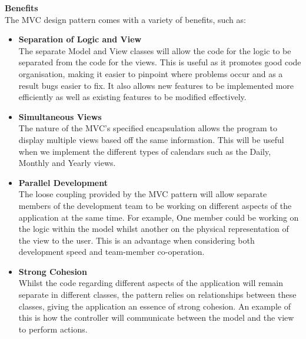 \documentclass[a4paper]{article}
\begin{document}
\textbf{Benefits} \\
The MVC design pattern comes with a variety of benefits, such as:
\begin{itemize}
    \item \textbf{Separation of Logic and View} \\
    The separate Model and View classes will allow the code for the logic to be separated from the code for the views. This is useful as it promotes good code organisation, making it easier to pinpoint where problems occur and as a result bugs easier to fix. It also allows new features to be implemented more efficiently as well as existing features to be modified effectively. \\
    \item \textbf{Simultaneous Views} \\
    The nature of the MVC's specified encapsulation allows the program to display multiple views based off the same information. This will be useful when we implement the different types of calendars such as the Daily, Monthly and Yearly views. \\
    \item \textbf{Parallel Development} \\
    The loose coupling provided by the MVC pattern will allow separate members of the development team to be working on different aspects of the application at the same time. For example, One member could be working on the logic within the model whilst another on the physical representation of the view to the user. This is an advantage when considering both development speed and team-member co-operation. \\
    \item \textbf{Strong Cohesion} \\
    Whilst the code regarding different aspects of the application will remain separate in different classes, the pattern relies on relationships between these classes, giving the application an essence of strong cohesion. An example of this is how the controller will communicate between the model and the view to perform actions.
\end{itemize}
\end{document}
